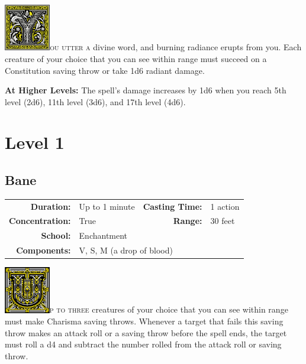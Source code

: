 \documentclass[12pt,showtrims]{memoir}
\begin{document}
\vspace{1\baselineskip}\noindent
\lettrine[lines=4]{\includegraphics[height=58pt]{initials/Y.png}}{ou utter a} divine word, and burning radiance erupts from you. Each creature of your choice that you can see within range must succeed on a Constitution saving throw or take 1d6 radiant damage.

\vspace{8pt} \noindent\textbf{At Higher Levels:} The spell’s damage increases by 1d6 when you reach 5th level (2d6), 11th level (3d6), and 17th level (4d6).
\newpage

\newpage
\chapter*{Level 1} 

\section*{Bane}
{
\small\centering\vspace{-6pt}
\begin{tabular}{rlrl}
\toprule

\textbf{Duration:} & Up to 1 minute &
\textbf{Casting Time:} & 1 action \\
\textbf{Concentration:} & True &
\textbf{Range:} & 30 feet \\
\textbf{School:} & Enchantment \\
\textbf{Components:} & \multicolumn{3}{p{0.7\textwidth}}{V, S, M (a drop of blood)}\\

\bottomrule
\end{tabular}
}

\vspace{1\baselineskip}\noindent
\lettrine[lines=4]{\includegraphics[height=58pt]{initials/U.png}}{p to three} creatures of your choice that you can see within range must make Charisma saving throws. Whenever a target that fails this saving throw makes an attack roll or a saving throw before the spell ends, the target must roll a d4 and subtract the number rolled from the attack roll or saving throw.
\end{document}
